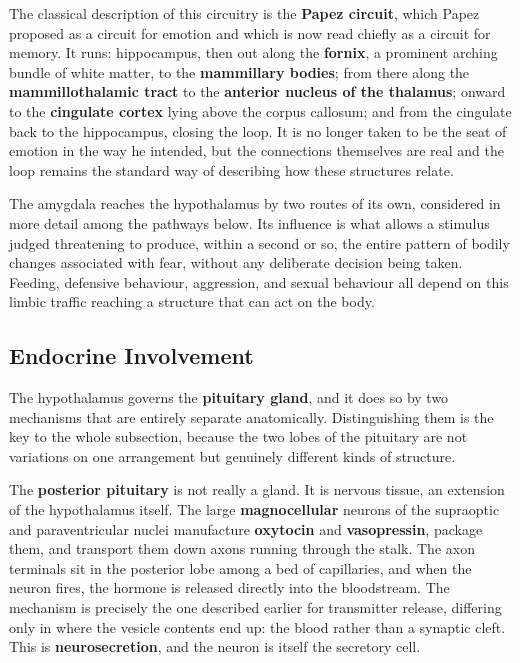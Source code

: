 \documentclass[11pt]{article}
\begin{document}
The classical description of this circuitry is the \textbf{Papez circuit}, which Papez proposed as a circuit for emotion and which is now read chiefly as a circuit for memory. It runs: hippocampus, then out along the \textbf{fornix}, a prominent arching bundle of white matter, to the \textbf{mammillary bodies}; from there along the \textbf{mammillothalamic tract} to the \textbf{anterior nucleus of the thalamus}; onward to the \textbf{cingulate cortex} lying above the corpus callosum; and from the cingulate back to the hippocampus, closing the loop. It is no longer taken to be the seat of emotion in the way he intended, but the connections themselves are real and the loop remains the standard way of describing how these structures relate.

The amygdala reaches the hypothalamus by two routes of its own, considered in more detail among the pathways below. Its influence is what allows a stimulus judged threatening to produce, within a second or so, the entire pattern of bodily changes associated with fear, without any deliberate decision being taken. Feeding, defensive behaviour, aggression, and sexual behaviour all depend on this limbic traffic reaching a structure that can act on the body.

\subsection{Endocrine Involvement}

The hypothalamus governs the \textbf{pituitary gland}, and it does so by two mechanisms that are entirely separate anatomically. Distinguishing them is the key to the whole subsection, because the two lobes of the pituitary are not variations on one arrangement but genuinely different kinds of structure.

The \textbf{posterior pituitary} is not really a gland. It is nervous tissue, an extension of the hypothalamus itself. The large \textbf{magnocellular} neurons of the supraoptic and paraventricular nuclei manufacture \textbf{oxytocin} and \textbf{vasopressin}, package them, and transport them down axons running through the stalk. The axon terminals sit in the posterior lobe among a bed of capillaries, and when the neuron fires, the hormone is released directly into the bloodstream. The mechanism is precisely the one described earlier for transmitter release, differing only in where the vesicle contents end up: the blood rather than a synaptic cleft. This is \textbf{neurosecretion}, and the neuron is itself the secretory cell.
\end{document}
